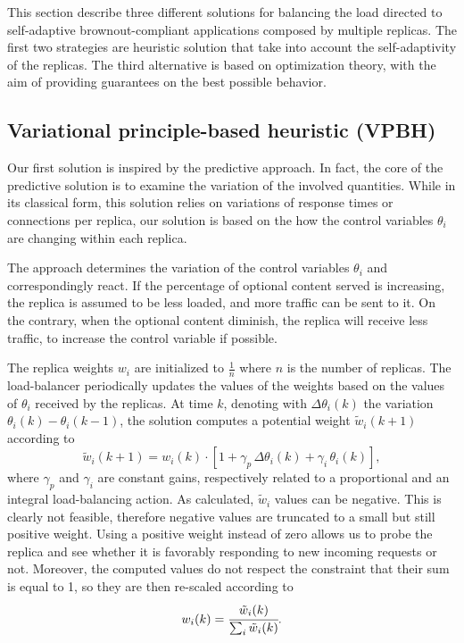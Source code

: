 This section describe three different solutions for balancing the load
directed to self-adaptive brownout-compliant applications composed by
multiple replicas. The first two strategies are heuristic solution
that take into account the self-adaptivity of the replicas. The third
alternative is based on optimization theory, with the aim of providing
guarantees on the best possible behavior.

\subsection{Variational principle-based heuristic (VPBH)}

Our first solution is inspired by the predictive approach. In fact,
the core of the predictive solution is to examine the variation of the
involved quantities. While in its classical form, this solution relies
on variations of response times or connections per replica, our
solution is based on the how the control variables $\theta_i$ are
changing within each replica.

The approach determines the variation of the control variables
$\theta_i$ and correspondingly react. If the percentage of optional
content served is increasing, the replica is assumed to be less
loaded, and more traffic can be sent to it. On the contrary, when the
optional content diminish, the replica will receive less traffic, to
increase the control variable if possible.

The replica weights $w_i$ are initialized to $\frac{1}{n}$ where $n$
is the number of replicas. The load-balancer periodically updates the
values of the weights based on the values of $\theta_i$ received by
the replicas. At time $k$, denoting with $\Delta \theta_i (k)$ the
variation $\theta_i (k) - \theta_i (k-1)$, the solution computes a
potential weight $\tilde{w}_i(k+1)$ according to
\begin{equation}
  \tilde{w}_i(k+1) = w_i(k) \cdot 
\left[ 1 + \gamma_p \, \Delta \theta_i (k) + \gamma_i \, \theta_i (k) \right] ,
\label{eq:theta-diff}
\end{equation}
where $\gamma_p$ and $\gamma_i$ are constant gains, respectively
related to a proportional and an integral load-balancing action. As
calculated, $\tilde{w}_i$ values can be negative. This is clearly not
feasible, therefore negative values are truncated to a small but still
positive weight. Using a positive weight instead of zero allows us to
probe the replica and see whether it is favorably responding to new
incoming requests or not. Moreover, the computed values do not respect
the constraint that their sum is equal to 1, so they are then
re-scaled according to
\begin{equation}
  w_i (k) = \cfrac{\tilde{w}_i (k)}{\sum_i \tilde{w}_i (k)}.
\label{eq:theta-diff-rescale}
\end{equation}

